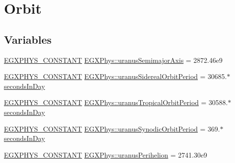 \hypertarget{group___e_g_x_phys-_constants-_astrophysics-_solar_system-_uranus-_orbit}{}\section{Orbit}
\label{group___e_g_x_phys-_constants-_astrophysics-_solar_system-_uranus-_orbit}
\subsection*{Variables}
\begin{DoxyCompactItemize}
\item 
\mbox{\hyperlink{group___e_g_x_phys-_constants-_macros_ga76980d288494ce1714c9ac68a95ba702}{E\+G\+X\+P\+H\+Y\+S\+\_\+\+C\+O\+N\+S\+T\+A\+NT}} \mbox{\hyperlink{group___e_g_x_phys-_constants-_astrophysics-_solar_system-_uranus-_orbit_ga34dc0986eab0b7450cf80dc5b17cd892}{E\+G\+X\+Phys\+::uranus\+Semimajor\+Axis}} = 2872.\+46e9
\item 
\mbox{\hyperlink{group___e_g_x_phys-_constants-_macros_ga76980d288494ce1714c9ac68a95ba702}{E\+G\+X\+P\+H\+Y\+S\+\_\+\+C\+O\+N\+S\+T\+A\+NT}} \mbox{\hyperlink{group___e_g_x_phys-_constants-_astrophysics-_solar_system-_uranus-_orbit_gaf2077b1c1b606d34f14b5d23ca2c160a}{E\+G\+X\+Phys\+::uranus\+Sidereal\+Orbit\+Period}} = 30685.$\ast$\mbox{\hyperlink{namespace_e_g_x_phys_a93d2a00d75411b58cbf63ab3fd1f8bc2}{seconds\+In\+Day}}
\item 
\mbox{\hyperlink{group___e_g_x_phys-_constants-_macros_ga76980d288494ce1714c9ac68a95ba702}{E\+G\+X\+P\+H\+Y\+S\+\_\+\+C\+O\+N\+S\+T\+A\+NT}} \mbox{\hyperlink{group___e_g_x_phys-_constants-_astrophysics-_solar_system-_uranus-_orbit_gaafe74005ae724e813166abbefc7a4458}{E\+G\+X\+Phys\+::uranus\+Tropical\+Orbit\+Period}} = 30588.$\ast$\mbox{\hyperlink{namespace_e_g_x_phys_a93d2a00d75411b58cbf63ab3fd1f8bc2}{seconds\+In\+Day}}
\item 
\mbox{\hyperlink{group___e_g_x_phys-_constants-_macros_ga76980d288494ce1714c9ac68a95ba702}{E\+G\+X\+P\+H\+Y\+S\+\_\+\+C\+O\+N\+S\+T\+A\+NT}} \mbox{\hyperlink{group___e_g_x_phys-_constants-_astrophysics-_solar_system-_uranus-_orbit_gaddf14c8c085286e28628dbdd11378081}{E\+G\+X\+Phys\+::uranus\+Synodic\+Orbit\+Period}} = 369.$\ast$\mbox{\hyperlink{namespace_e_g_x_phys_a93d2a00d75411b58cbf63ab3fd1f8bc2}{seconds\+In\+Day}}
\item 
\mbox{\hyperlink{group___e_g_x_phys-_constants-_macros_ga76980d288494ce1714c9ac68a95ba702}{E\+G\+X\+P\+H\+Y\+S\+\_\+\+C\+O\+N\+S\+T\+A\+NT}} \mbox{\hyperlink{group___e_g_x_phys-_constants-_astrophysics-_solar_system-_uranus-_orbit_ga74776252e25eeb9c02bc5a69087888b5}{E\+G\+X\+Phys\+::uranus\+Perihelion}} = 2741.\+30e9

\end{DoxyCompactItemize}
